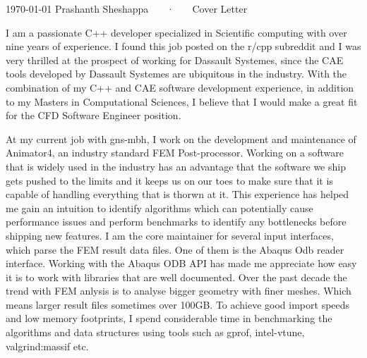 \documentclass[11pt, a4paper]{awesome-cv}
\begin{document}
\makecvheader[R]

\makecvfooter
  {\today}
  {Prashanth Sheshappa ~~~·~~~ Cover Letter}
  {}

\makelettertitle

\begin{cvletter}


I am a passionate C++ developer specialized in Scientific computing with over nine years of experience.
I found this job posted on the r/cpp subreddit and I was very thrilled at the prospect of working for Dassault Systemes, since
the CAE tools developed by Dassault Systemes are ubiquitous in the industry. With the combination of my C++  
and CAE software development experience, in addition to my Masters in Computational Sciences, I believe that I would make a great 
fit for the CFD Software Engineer position.

At my current job with gns-mbh, I work on the development and maintenance of 
Animator4, an industry standard FEM Post-processor.  
Working on a software that is widely used in the industry has an advantage 
that the software we ship gets pushed to the limits and it keeps us on our toes 
to make sure that it is capable of handling everything that is thorwn at it. 
This experience has helped me gain an intuition to identify algorithms which 
can potentially cause performance issues and perform benchmarks to identify any 
bottlenecks before shipping new features.
I am the core maintainer for several input interfaces, which parse the FEM 
result data files. One of them is the Abaqus Odb reader interface. Working with 
the Abaqus ODB API has made me appreciate how easy it is to work with libraries 
that are well documented.
Over the past decade the trend with FEM anlysis is to analyse bigger geometry 
with finer meshes. Which means larger result files sometimes over 100GB. 
To achieve good import speeds and low memory footprints, I spend considerable time
in benchmarking the algorithms and data structures using tools such as gprof, 
intel-vtune, valgrind:massif etc. 


\end{cvletter}
\end{document}
